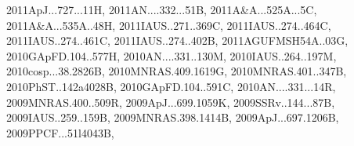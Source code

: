 \documentclass[12pt]{article}
\begin{document}
\begin{enumerate}
\begin{enumerate}
{2011ApJ...727...11H,%
2011AN....332...51B,%
2011A&A...525A...5C,%
2011A&A...535A..48H,%
2011IAUS..271..369C,%
2011IAUS..274..464C,%
2011IAUS..274..461C,%
2011IAUS..274..402B,%
2011AGUFMSH54A..03G,%
2010GApFD.104..577H,%
2010AN....331..130M,%
2010IAUS..264..197M,%
2010cosp...38.2826B,%
2010MNRAS.409.1619G,%
2010MNRAS.401..347B,%
2010PhST..142a4028B,%
2010GApFD.104..591C,%
2010AN....331...14R,%
2009MNRAS.400..509R,%
2009ApJ...699.1059K,%
2009SSRv..144...87B,%
2009IAUS..259..159B,%
2009MNRAS.398.1414B,%
2009ApJ...697.1206B,%
2009PPCF...51l4043B,%
}
\end{enumerate}
\end{enumerate}
\end{document}
